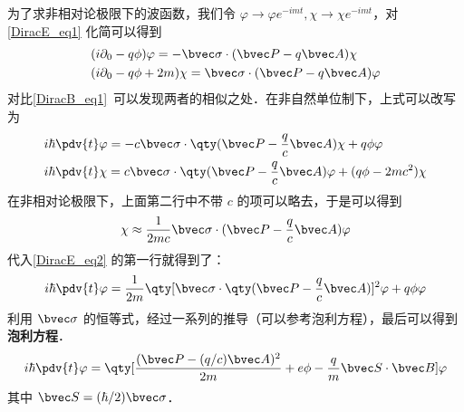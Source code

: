 为了求非相对论极限下的波函数，我们令 $\varphi\rightarrow \varphi e^{-imt},\chi\rightarrow \chi e^{-imt}$，对 \autoref{DiracE_eq1} 化简可以得到
\begin{equation}
\begin{aligned}
&(i\partial_0 - q \phi)\varphi = -\bvec \sigma\cdot (\bvec P-q\bvec A) \chi\\
&(i\partial_0 - q \phi + 2m) \chi = \bvec \sigma\cdot (\bvec P-q\bvec A)  \varphi
\end{aligned}
\end{equation}
对比\autoref{DiracB_eq1}~可以发现两者的相似之处．在非自然单位制下，上式可以改写为
\begin{equation}\label{DiracE_eq2}
\begin{aligned}
&i\hbar \pdv{t} \varphi = -c\bvec \sigma\cdot \qty(\bvec P-\frac{q}{c}\bvec A)\chi + q \phi \varphi\\
&i\hbar\pdv{t} \chi = c \bvec \sigma\cdot \qty(\bvec P-\frac{q}{c}\bvec A) \varphi + (q \phi-2mc^2) \chi
\end{aligned}
\end{equation}
在非相对论极限下，上面第二行中不带 $c$ 的项可以略去，于是可以得到
\begin{equation}
\chi\approx \frac{1}{2mc} \bvec \sigma \cdot(\bvec P-\frac{q}{c}\bvec A)\varphi
\end{equation}
代入\autoref{DiracE_eq2} 的第一行就得到了：
\begin{equation}
i\hbar\pdv{t} \varphi = \frac{1}{2m}\qty[\bvec \sigma \cdot\qty(\bvec P - \frac{q}{c}\bvec A)]^2 \varphi + q\phi  \varphi
\end{equation}
利用 $\bvec \sigma$ 的恒等式，经过一系列的推导（可以参考泡利方程），最后可以得到\textbf{泡利方程}．
\begin{equation}
i\hbar\pdv{t} \varphi = \qty[\frac{(\bvec P - (q/c)\bvec A)^2}{2m}+e\phi-\frac{q}{m}\bvec S\cdot \bvec B]\varphi
\end{equation}
其中 $\bvec S=(\hbar/2)\bvec \sigma$．